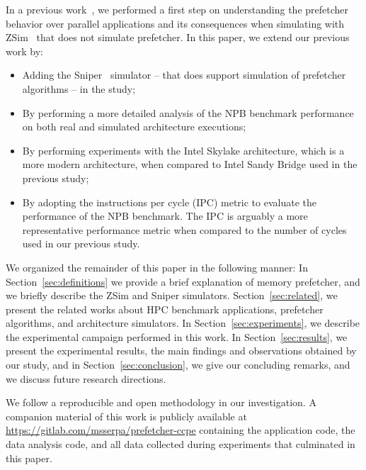 \documentclass[AMA,final,STIX1COL]{WileyNJD-v2}
\def\COMPANION{{\scriptsize\url{https://gitlab.com/msserpa/prefetcher-ccpe}}\xspace}
\begin{document}
In a previous work~\cite{girelli2019impacto}, we performed a first step on understanding the prefetcher behavior over parallel applications and its consequences when simulating with ZSim~\cite{sanchez2013zsim} that does not simulate prefetcher. In this paper, we extend our previous work by:

\begin{itemize}
    \item Adding the Sniper~\cite{carlson2014aeohmcm} simulator -- that does support simulation of prefetcher algorithms -- in the study;
    \item By performing a more detailed analysis of the NPB benchmark performance on both real and simulated architecture executions;
    \item By performing experiments with the Intel Skylake architecture, which is a more modern architecture, when compared to Intel Sandy Bridge used in the previous study;
    \item By adopting the instructions per cycle (IPC) metric to evaluate the performance of the NPB benchmark. The IPC is arguably a more representative performance metric when compared to the number of cycles used in our previous study.
\end{itemize}

We organized the remainder of this paper in the following manner: In Section~\ref{sec:definitions} we provide a brief explanation of memory prefetcher, and we briefly describe the ZSim and Sniper simulators. Section~\ref{sec:related}, we present the related works about HPC benchmark applications, prefetcher algorithms, and architecture simulators. In Section~\ref{sec:experiments}, we describe the experimental campaign performed in this work. In Section~\ref{sec:results}, we present the experimental results, the main findings and observations obtained by our study, and in Section~\ref{sec:conclusion}, we give our concluding remarks, and we discuss future research directions.

We follow a reproducible and open methodology in our investigation. A companion material of this work is publicly available at \COMPANION containing the application code, the data analysis code, and all data collected during experiments that culminated in this paper.
  
\end{document}
